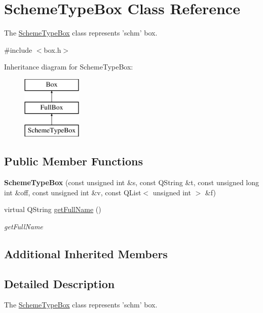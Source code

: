 \hypertarget{class_scheme_type_box}{\section{Scheme\-Type\-Box Class Reference}
\label{class_scheme_type_box}
}


The \hyperlink{class_scheme_type_box}{Scheme\-Type\-Box} class represents 'schm' box.  




{\ttfamily \#include $<$box.\-h$>$}

Inheritance diagram for Scheme\-Type\-Box\-:\begin{figure}[H]
\begin{center}
\leavevmode
\includegraphics[height=3.000000cm]{class_scheme_type_box}
\end{center}
\end{figure}
\subsection*{Public Member Functions}
\begin{DoxyCompactItemize}
\item 
\hypertarget{class_scheme_type_box_a471f31ef79abb3d504e1f642bbfbb954}{{\bfseries Scheme\-Type\-Box} (const unsigned int \&s, const Q\-String \&t, const unsigned long int \&off, const unsigned int \&v, const Q\-List$<$ unsigned int $>$ \&f)}\label{class_scheme_type_box_a471f31ef79abb3d504e1f642bbfbb954}

\item 
virtual Q\-String \hyperlink{class_scheme_type_box_a0a66d06868e206070ba44ef2324e4e31}{get\-Full\-Name} ()
\begin{DoxyCompactList}\small\item\em get\-Full\-Name \end{DoxyCompactList}\end{DoxyCompactItemize}
\subsection*{Additional Inherited Members}


\subsection{Detailed Description}
The \hyperlink{class_scheme_type_box}{Scheme\-Type\-Box} class represents 'schm' box. 

